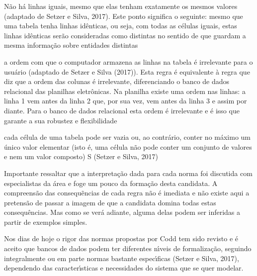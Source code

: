 \documentclass[
12pt,		%
openright,	%
twoside,  %
a4paper,			%
chapter=TITLE,		%
english,			%
french,				%
spanish,			%
brazil				%
]{USPSC-classe/USPSC}
\begin{document}
\begin{alineas}
\item N\~ao h\'a linhas iguais, mesmo que elas tenham exatamente os mesmos valores  (adaptado de Setzer e Silva, 2017). Este ponto significa o seguinte: mesmo que uma tabela tenha linhas id\^enticas, ou seja, com todas as c\'elulas iguais, estas linhas id\^enticas ser\~ao consideradas como distintas no sentido de que guardam a mesma informa\c{c}\~ao sobre entidades distintas
\item a ordem com que o computador armazena as linhas na tabela \'e irrelevante para o usu\'ario  (adaptado de Setzer e Silva (2017)). Esta regra \'e equivalente \`a regra que diz que a ordem das colunas \'e irrelevante, diferenciando o banco de dados relacional das planilhas eletr\^onicas. Na planilha existe uma ordem nas linhas: a linha 1 vem antes da linha 2 que, por sua vez, vem antes da linha 3 e assim por diante. Para o banco de dados relacional esta ordem \'e irrelevante e \'e isso que garante a sua robustez e flexibilidade
\item cada c\'elula de uma tabela pode ser vazia ou, ao contr\'ario, conter no m\'aximo um \'unico valor elementar (isto \'e, uma c\'elula n\~ao pode conter um conjunto de valores e nem um valor composto)  S (Setzer e Silva, 2017)
\end{alineas}

Importante ressaltar que a interpreta\c{c}\~ao dada para cada norma foi discutida com especialistas da \'area e foge um pouco da forma\c{c}\~ao desta candidata. A compreens\~ao das consequẽncias de cada regra n\~ao \'e imediata e n\~ao existe aqui a pretens\~ao de passar a imagem de que a candidata domina todas estas consequ\^encias. Mas como se ver\'a adiante, alguma delas podem ser inferidas a partir de exemplos simples.














Nos dias de hoje o rigor das normas propostas por Codd tem sido revisto e \'e aceito que bancos de dados podem ter diferentes n\'{\i}veis de formaliza\c{c}\~ao, seguindo integralmente ou em parte normas bastante espec\'{\i}ficas (Setzer e Silva, 2017), dependendo das caracter\'{\i}sticas e necessidades do sistema que se quer modelar.
\end{document}

